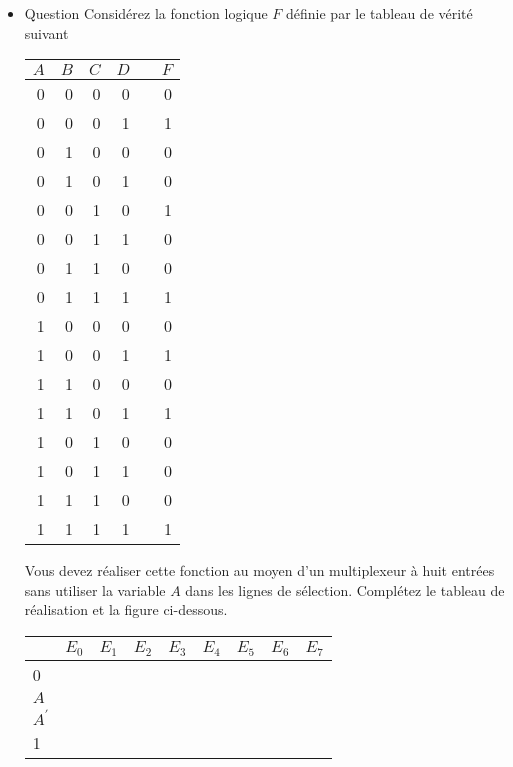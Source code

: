 \documentclass[letter, oneside]{book}
\begin{document}
\begin{itemize}
\item Question
\label{sec:org17706a3}
Considérez la fonction logique \(F\) définie par le tableau de vérité suivant
\begin{center}
\begin{tabular}{rrrrlr}
\(A\) & \(B\) & \(C\) & \(D\) &  & \(F\)\\[0pt]
\hline
0 & 0 & 0 & 0 &  & 0\\[0pt]
0 & 0 & 0 & 1 &  & 1\\[0pt]
0 & 1 & 0 & 0 &  & 0\\[0pt]
0 & 1 & 0 & 1 &  & 0\\[0pt]
0 & 0 & 1 & 0 &  & 1\\[0pt]
0 & 0 & 1 & 1 &  & 0\\[0pt]
0 & 1 & 1 & 0 &  & 0\\[0pt]
0 & 1 & 1 & 1 &  & 1\\[0pt]
1 & 0 & 0 & 0 &  & 0\\[0pt]
1 & 0 & 0 & 1 &  & 1\\[0pt]
1 & 1 & 0 & 0 &  & 0\\[0pt]
1 & 1 & 0 & 1 &  & 1\\[0pt]
1 & 0 & 1 & 0 &  & 0\\[0pt]
1 & 0 & 1 & 1 &  & 0\\[0pt]
1 & 1 & 1 & 0 &  & 0\\[0pt]
1 & 1 & 1 & 1 &  & 1\\[0pt]
\end{tabular}
\end{center}
Vous devez réaliser cette fonction au moyen d'un multiplexeur à huit
entrées sans utiliser la variable \(A\) dans les lignes de
sélection. Complétez le tableau de réalisation et la figure
ci-dessous.
\begin{center}
\begin{tabular}{lllllllll}
 & \(E_0\) & \(E_1\) & \(E_2\) & \(E_3\) & \(E_4\) & \(E_5\) & \(E_6\) & \(E_7\)\\[0pt]
\hline
0 &  &  &  &  &  &  &  & \\[0pt]
\(A\) &  &  &  &  &  &  &  & \\[0pt]
\(A^{\prime}\) &  &  &  &  &  &  &  & \\[0pt]
1 &  &  &  &  &  &  &  & \\[0pt]
\end{tabular}
\end{center}

\begin{center}

\end{center}


\end{itemize}
\end{document}
